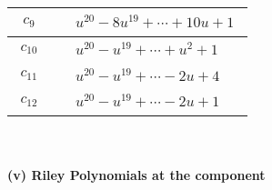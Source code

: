 \documentclass[1p]{elsarticle_modified}
\theoremstyle{definition}
\begin{document}
\begin{tabular}{m{50pt}|m{274pt}}
\hline $$\begin{aligned}c_{9}\end{aligned}$$&$\begin{aligned}
&u^{20}-8 u^{19}+\cdots+10 u+1
\end{aligned}$\\
\hline $$\begin{aligned}c_{10}\end{aligned}$$&$\begin{aligned}
&u^{20}- u^{19}+\cdots+u^2+1
\end{aligned}$\\
\hline $$\begin{aligned}c_{11}\end{aligned}$$&$\begin{aligned}
&u^{20}- u^{19}+\cdots-2 u+4
\end{aligned}$\\
\hline $$\begin{aligned}c_{12}\end{aligned}$$&$\begin{aligned}
&u^{20}- u^{19}+\cdots-2 u+1
\end{aligned}$\\
\hline
\end{tabular}\\~\\
\newpage\renewcommand{\arraystretch}{1}
\flushleft \textbf{(v) Riley Polynomials at the component}\newline \\
\end{document}
